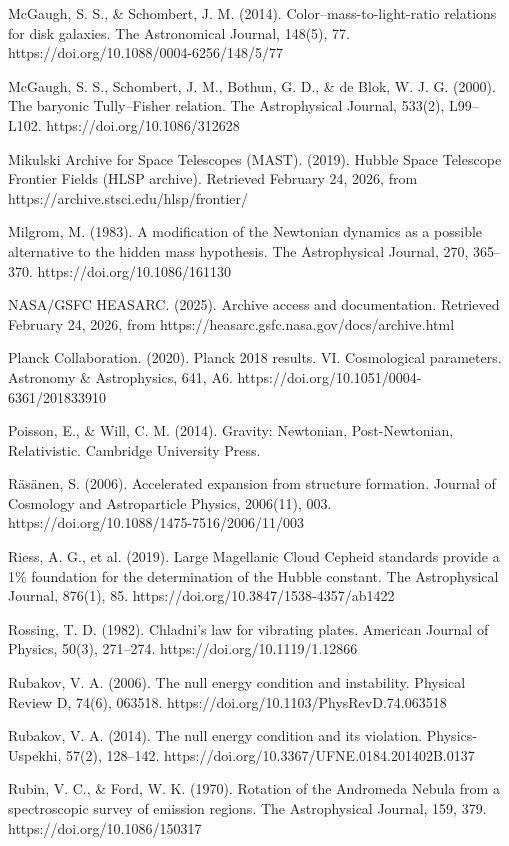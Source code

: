 \documentclass[11pt]{article}
\begin{document}
McGaugh, S. S., \& Schombert, J. M. (2014). Color--mass-to-light-ratio relations for disk galaxies. The Astronomical Journal, 148(5), 77. https://doi.org/10.1088/0004-6256/148/5/77

McGaugh, S. S., Schombert, J. M., Bothun, G. D., \& de Blok, W. J. G. (2000). The baryonic Tully--Fisher relation. The Astrophysical Journal, 533(2), L99--L102. https://doi.org/10.1086/312628

Mikulski Archive for Space Telescopes (MAST). (2019). Hubble Space Telescope Frontier Fields (HLSP archive). Retrieved February 24, 2026, from https://archive.stsci.edu/hlsp/frontier/

Milgrom, M. (1983). A modification of the Newtonian dynamics as a possible alternative to the hidden mass hypothesis. The Astrophysical Journal, 270, 365--370. https://doi.org/10.1086/161130

NASA/GSFC HEASARC. (2025). Archive access and documentation. Retrieved February 24, 2026, from https://heasarc.gsfc.nasa.gov/docs/archive.html

Planck Collaboration. (2020). Planck 2018 results. VI. Cosmological parameters. Astronomy \& Astrophysics, 641, A6. https://doi.org/10.1051/0004-6361/201833910

Poisson, E., \& Will, C. M. (2014). Gravity: Newtonian, Post-Newtonian, Relativistic. Cambridge University Press.

Räsänen, S. (2006). Accelerated expansion from structure formation. Journal of Cosmology and Astroparticle Physics, 2006(11), 003. https://doi.org/10.1088/1475-7516/2006/11/003

Riess, A. G., et al. (2019). Large Magellanic Cloud Cepheid standards provide a 1\% foundation for the determination of the Hubble constant. The Astrophysical Journal, 876(1), 85. https://doi.org/10.3847/1538-4357/ab1422

Rossing, T. D. (1982). Chladni's law for vibrating plates. American Journal of Physics, 50(3), 271--274. https://doi.org/10.1119/1.12866

Rubakov, V. A. (2006). The null energy condition and instability. Physical Review D, 74(6), 063518. https://doi.org/10.1103/PhysRevD.74.063518

Rubakov, V. A. (2014). The null energy condition and its violation. Physics-Uspekhi, 57(2), 128--142. https://doi.org/10.3367/UFNE.0184.201402B.0137

Rubin, V. C., \& Ford, W. K. (1970). Rotation of the Andromeda Nebula from a spectroscopic survey of emission regions. The Astrophysical Journal, 159, 379. https://doi.org/10.1086/150317
\end{document}
